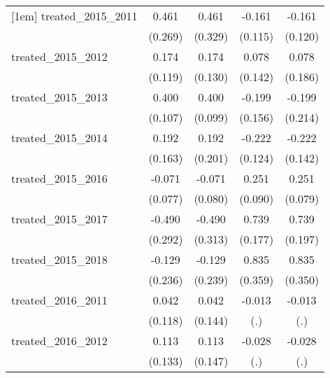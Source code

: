 {\begin{tabular}{l*{4}{c}}
[1em]
treated\_2015\_2011&       0.461         &       0.461         &      -0.161         &      -0.161         \\
            &     (0.269)         &     (0.329)         &     (0.115)         &     (0.120)         \\
[1em]
treated\_2015\_2012&       0.174         &       0.174         &       0.078         &       0.078         \\
            &     (0.119)         &     (0.130)         &     (0.142)         &     (0.186)         \\
[1em]
treated\_2015\_2013&       0.400\sym{***}&       0.400\sym{***}&      -0.199         &      -0.199         \\
            &     (0.107)         &     (0.099)         &     (0.156)         &     (0.214)         \\
[1em]
treated\_2015\_2014&       0.192         &       0.192         &      -0.222         &      -0.222         \\
            &     (0.163)         &     (0.201)         &     (0.124)         &     (0.142)         \\
[1em]
treated\_2015\_2016&      -0.071         &      -0.071         &       0.251\sym{**} &       0.251\sym{**} \\
            &     (0.077)         &     (0.080)         &     (0.090)         &     (0.079)         \\
[1em]
treated\_2015\_2017&      -0.490         &      -0.490         &       0.739\sym{***}&       0.739\sym{***}\\
            &     (0.292)         &     (0.313)         &     (0.177)         &     (0.197)         \\
[1em]
treated\_2015\_2018&      -0.129         &      -0.129         &       0.835\sym{*}  &       0.835\sym{*}  \\
            &     (0.236)         &     (0.239)         &     (0.359)         &     (0.350)         \\
[1em]
treated\_2016\_2011&       0.042         &       0.042         &      -0.013         &      -0.013         \\
            &     (0.118)         &     (0.144)         &         (.)         &         (.)         \\
[1em]
treated\_2016\_2012&       0.113         &       0.113         &      -0.028         &      -0.028         \\
            &     (0.133)         &     (0.147)         &         (.)         &         (.)         \\

\end{tabular}}

